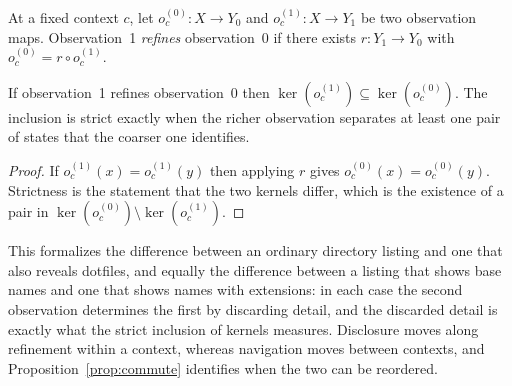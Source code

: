 \begin{definition}\label{def:disclosure}
At a fixed context $c$, let $o_c^{(0)}:X\to Y_0$ and $o_c^{(1)}:X\to Y_1$ be two observation maps. Observation~1 \emph{refines} observation~0 if there exists $r:Y_1\to Y_0$ with $o_c^{(0)}=r\circ o_c^{(1)}$.
\end{definition}

\begin{theorem}\label{thm:disclosure}
If observation~1 refines observation~0 then $\ker(o_c^{(1)})\subseteq\ker(o_c^{(0)})$. The inclusion is strict exactly when the richer observation separates at least one pair of states that the coarser one identifies.
\end{theorem}
\begin{proof}
If $o_c^{(1)}(x)=o_c^{(1)}(y)$ then applying $r$ gives $o_c^{(0)}(x)=o_c^{(0)}(y)$. Strictness is the statement that the two kernels differ, which is the existence of a pair in $\ker(o_c^{(0)})\setminus\ker(o_c^{(1)})$.
\end{proof}

This formalizes the difference between an ordinary directory listing and one that also reveals dotfiles, and equally the difference between a listing that shows base names and one that shows names with extensions: in each case the second observation determines the first by discarding detail, and the discarded detail is exactly what the strict inclusion of kernels measures. Disclosure moves along refinement within a context, whereas navigation moves between contexts, and Proposition~\ref{prop:commute} identifies when the two can be reordered.

